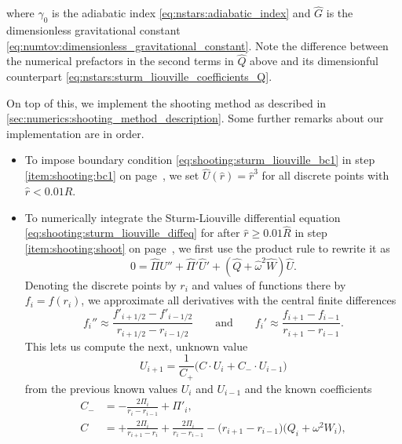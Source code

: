 where $\gamma_0$ is the adiabatic index \eqref{eq:nstars:adiabatic_index} and $\hat{G}$ is the dimensionless gravitational constant \eqref{eq:numtov:dimensionless_gravitational_constant}.
Note the difference between the numerical prefactors in the second terms in $\hat{Q}$ above and its dimensionful counterpart \eqref{eq:nstars:sturm_liouville_coefficients_Q}.

On top of this, we implement the shooting method as described in \cref{sec:numerics:shooting_method_description}.
Some further remarks about our implementation are in order.
\begin{itemize}
\item To impose boundary condition \eqref{eq:shooting:sturm_liouville_bc1} in step \ref{item:shooting:bc1} on page~\pageref{item:shooting:bc1}, we set $\hat{U}(\hat{r}) = \hat{r}^3$ for all discrete points with $\hat{r} < 0.01 \hat{R}$.
\item To numerically integrate the Sturm-Liouville differential equation \eqref{eq:shooting:sturm_liouville_diffeq} for after $\hat{r} \geq 0.01 \hat{R}$ in step \ref{item:shooting:shoot} on page~\pageref{item:shooting:shoot}, we first use the product rule to rewrite it as
      \begin{equation}
	      0 = \hat{\Pi} \hat{U}'' + \hat{\Pi}' \hat{U}' + \left( \hat{Q} + \hat{\omega}^2 \hat{W} \right) \hat{U} .
      \end{equation}
      Denoting the discrete points by $r_i$ and values of functions there by $f_i = f(r_i)$, we approximate all derivatives with the central finite differences
      \begin{equation}
          f_i'' \approx \frac{f'_{i+1/2}-f'_{i-1/2}}{r_{i+1/2}-r_{i-1/2}}
          \qquad \text{and} \qquad
          f_i' \approx \frac{f_{i+1}-f_{i-1}}{r_{i+1}-r_{i-1}} .
      \end{equation}
      This lets us compute the next, unknown value
      \begin{equation}
            U_{i+1} = \frac{1}{C_+} \Big( C \cdot U_i + C_- \cdot U_{i-1} \Big)
      \end{equation}
      from the previous known values $U_i$ and $U_{i-1}$ and the known coefficients
      \begin{subequations}
      \begin{align}
          C_-             &= -\frac{2 \Pi_i}{r_i-r_{i-1}} + \Pi'_i , \\
          C_{\phantom{-}} &= +\frac{2 \Pi_i}{r_{i+1}-r_i} + \frac{2 \Pi_i}{r_i-r_{i-1}} - \Big( r_{i+1} - r_{i-1} \Big) \Big( Q_i + \omega^2 W_i \Big) , \\

\end{align}
\end{subequations}
\end{itemize}
